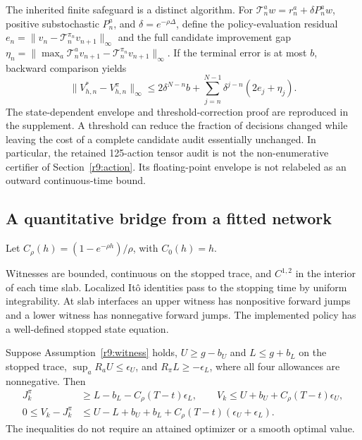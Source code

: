The inherited finite safeguard is a distinct algorithm. For $\mathcal T_n^aw=r_n^a+\delta P_n^aw$, positive substochastic $P_n^a$, and $\delta=e^{-\rho\Delta}$, define the policy-evaluation residual $e_n=\|v_n-\mathcal T_n^{\pi_n}v_{n+1}\|_\infty$ and the full candidate improvement gap $\eta_n=\|\max_a\mathcal T_n^av_{n+1}-\mathcal T_n^{\pi_n}v_{n+1}\|_\infty$. If the terminal error is at most $b$, backward comparison yields
\begin{equation}
 \|V_{h,n}^*-V_{h,n}^{\pi}\|_\infty
 \leq2\delta^{N-n}b+\sum_{j=n}^{N-1}\delta^{j-n}(2e_j+\eta_j).\label{r9:finite}
\end{equation}
The state-dependent envelope and threshold-correction proof are reproduced in the supplement. A threshold can reduce the fraction of decisions changed while leaving the cost of a complete candidate audit essentially unchanged. In particular, the retained 125-action tensor audit is not the non-enumerative certifier of Section~\ref{r9:action}. Its floating-point envelope is not relabeled as an outward continuous-time bound.

\subsection{A quantitative bridge from a fitted network}
Let $C_\rho(h)=(1-e^{-\rho h})/\rho$, with $C_0(h)=h$.
\begin{assumption}\label{r9:witness}
Witnesses are bounded, continuous on the stopped trace, and $C^{1,2}$ in the interior of each time slab. Localized It\^o identities pass to the stopping time by uniform integrability. At slab interfaces an upper witness has nonpositive forward jumps and a lower witness has nonnegative forward jumps. The implemented policy has a well-defined stopped state equation.
\end{assumption}
\begin{theorem}\label{r9:pair}
Suppose Assumption~\ref{r9:witness} holds, $U\geq g-b_U$ and $L\leq g+b_L$ on the stopped trace, $\sup_aR_aU\leq\epsilon_U$, and $R_\pi L\geq-\epsilon_L$, where all four allowances are nonnegative. Then
\begin{align}
 J_k^\pi&\geq L-b_L-C_\rho(T-t)\epsilon_L,\qquad
 V_k\leq U+b_U+C_\rho(T-t)\epsilon_U,\\
 0\leq V_k-J_k^\pi&\leq U-L+b_U+b_L+C_\rho(T-t)(\epsilon_U+\epsilon_L).\label{r9:pairbound}
\end{align}
The inequalities do not require an attained optimizer or a smooth optimal value.
\end{theorem}

